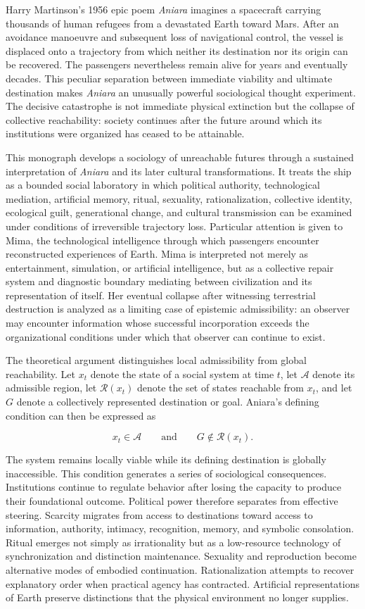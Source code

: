 \documentclass[11pt,oneside]{book}
\theoremstyle{definition}
\theoremstyle{remark}
\newcommand{\A}{\mathcal{A}}
\newcommand{\Reach}{\mathcal{R}}
\begin{document}
Harry Martinson's 1956 epic poem \emph{Aniara} imagines a spacecraft carrying thousands of human refugees from a devastated Earth toward Mars. After an avoidance manoeuvre and subsequent loss of navigational control, the vessel is displaced onto a trajectory from which neither its destination nor its origin can be recovered. The passengers nevertheless remain alive for years and eventually decades. This peculiar separation between immediate viability and ultimate destination makes \emph{Aniara} an unusually powerful sociological thought experiment. The decisive catastrophe is not immediate physical extinction but the collapse of collective reachability: society continues after the future around which its institutions were organized has ceased to be attainable.

This monograph develops a sociology of unreachable futures through a sustained interpretation of \emph{Aniara} and its later cultural transformations. It treats the ship as a bounded social laboratory in which political authority, technological mediation, artificial memory, ritual, sexuality, rationalization, collective identity, ecological guilt, generational change, and cultural transmission can be examined under conditions of irreversible trajectory loss. Particular attention is given to Mima, the technological intelligence through which passengers encounter reconstructed experiences of Earth. Mima is interpreted not merely as entertainment, simulation, or artificial intelligence, but as a collective repair system and diagnostic boundary mediating between civilization and its representation of itself. Her eventual collapse after witnessing terrestrial destruction is analyzed as a limiting case of epistemic admissibility: an observer may encounter information whose successful incorporation exceeds the organizational conditions under which that observer can continue to exist.

The theoretical argument distinguishes local admissibility from global reachability. Let \(x_t\) denote the state of a social system at time \(t\), let \(\A\) denote its admissible region, let \(\Reach(x_t)\) denote the set of states reachable from \(x_t\), and let \(G\) denote a collectively represented destination or goal. Aniara's defining condition can then be expressed as

\[
x_t \in \A
\qquad\text{and}\qquad
G \notin \Reach(x_t).
\]

The system remains locally viable while its defining destination is globally inaccessible. This condition generates a series of sociological consequences. Institutions continue to regulate behavior after losing the capacity to produce their foundational outcome. Political power therefore separates from effective steering. Scarcity migrates from access to destinations toward access to information, authority, intimacy, recognition, memory, and symbolic consolation. Ritual emerges not simply as irrationality but as a low-resource technology of synchronization and distinction maintenance. Sexuality and reproduction become alternative modes of embodied continuation. Rationalization attempts to recover explanatory order when practical agency has contracted. Artificial representations of Earth preserve distinctions that the physical environment no longer supplies.
\end{document}
